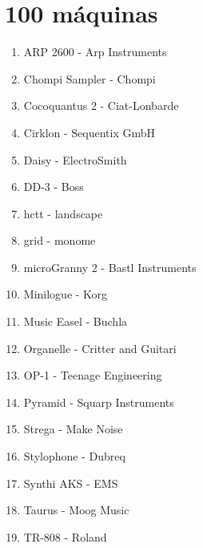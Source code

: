 \documentclass[../principal.tex]{subfiles}
\begin{document}
\chapter{100 máquinas}

\begin{enumerate}
    \item ARP 2600 - Arp Instruments
    \item Chompi Sampler - Chompi
    \item Cocoquantus 2 - Ciat-Lonbarde
    \item Cirklon - Sequentix GmbH
    \item Daisy - ElectroSmith
    \item DD-3 - Boss
    \item hctt - landscape
    \item grid - monome
    \item microGranny 2 - Bastl Instruments
    \item Minilogue - Korg
    \item Music Easel - Buchla
    \item Organelle - Critter and Guitari
    \item OP-1 - Teenage Engineering
    \item Pyramid - Squarp Instruments
    \item Strega - Make Noise
    \item Stylophone - Dubreq
    \item Synthi AKS - EMS
    \item Taurus - Moog Music
    \item TR-808 - Roland

\end{enumerate}
\end{document}
